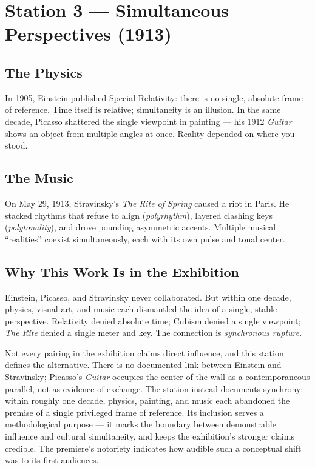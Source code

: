 \documentclass[11pt]{article}
\begin{document}
\section{Station 3 --- Simultaneous Perspectives (1913)}

\subsection{The Physics}
In 1905, Einstein published Special Relativity: there is no single, absolute frame of
reference. Time itself is relative; simultaneity is an illusion. In the same decade, Picasso
shattered the single viewpoint in painting --- his 1912 \emph{Guitar} shows an object from
multiple angles at once. Reality depended on where you stood.

\subsection{The Music}
On May 29, 1913, Stravinsky's \emph{The Rite of Spring} caused a riot in Paris. He stacked
rhythms that refuse to align (\emph{polyrhythm}), layered clashing keys
(\emph{polytonality}), and drove pounding asymmetric accents. Multiple musical ``realities''
coexist simultaneously, each with its own pulse and tonal center.

\subsection{Why This Work Is in the Exhibition}
Einstein, Picasso, and Stravinsky never collaborated. But within one decade, physics, visual
art, and music each dismantled the idea of a single, stable perspective. Relativity denied
absolute time; Cubism denied a single viewpoint; \emph{The Rite} denied a single meter and
key. The connection is \emph{synchronous rupture}.

Not every pairing in the exhibition claims direct influence, and this station defines the
alternative. There is no documented link between Einstein and Stravinsky; Picasso's
\emph{Guitar} occupies the center of the wall as a contemporaneous parallel, not as evidence
of exchange. The station instead documents synchrony: within roughly one decade, physics,
painting, and music each abandoned the premise of a single privileged frame of reference. Its
inclusion serves a methodological purpose --- it marks the boundary between demonstrable
influence and cultural simultaneity, and keeps the exhibition's stronger claims credible. The
premiere's notoriety indicates how audible such a conceptual shift was to its first
audiences.
\end{document}
